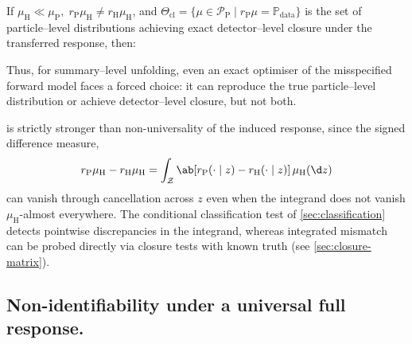 \documentclass[12pt]{article}
\newcommand{\Herwig}{\mathrm{H}}
\newcommand{\Pythia}{\mathrm{P}}
\newcommand{\Prb}{\mathbb{P}}
\newcommand{\KL}{D_{\mathrm{KL}}}
\newcommand{\Meas}{\mathcal{P}}
\newcommand{\1}{\mathbbm{1}}
\renewcommand{\[}{\begin{equation}}
\renewcommand{\]}{\end{equation}}
\begin{document}
    \begin{proposition}
    \label{prop:misspecified}
        If \(\mu_\Herwig \ll \mu_\Pythia,\;r_\Pythia\mu_\Herwig \ne r_\Herwig\mu_\Herwig\), and \(\Theta_{\mathrm{cl}} = \{ \mu \in \Meas_\Pythia \mid r_\Pythia \mu = \Prb_{\mathrm{data}} \}\) is the set of particle--level distributions achieving exact detector--level closure under the transferred response, then:
    \end{proposition}

    Thus, for summary--level unfolding, even an exact optimiser of the misspecified forward model faces a forced choice: it can reproduce the true particle--level distribution or achieve detector--level closure, but not both.

    \begin{remark}
    \noproofref
    \label{rem:folded}
         is strictly stronger than non-universality of the induced response, since the signed difference measure,
        \[
            r_\Pythia\mu_\Herwig-r_\Herwig\mu_\Herwig=\int_{\mathcal Z}\ab[r_\Pythia(\cdot\mid z)-r_\Herwig(\cdot\mid z)]\,\mu_\Herwig(\d z)
        \]
        can vanish through cancellation across \(z\) even when the integrand does not vanish \(\mu_\Herwig\)-almost everywhere.
        The conditional classification test of \cref{sec:classification} detects pointwise discrepancies in the integrand, whereas integrated mismatch can be probed directly via closure tests with known truth (see \cref{sec:closure-matrix}).
    \end{remark}

    \subsection{Non-identifiability under a universal full response.}
\end{document}
